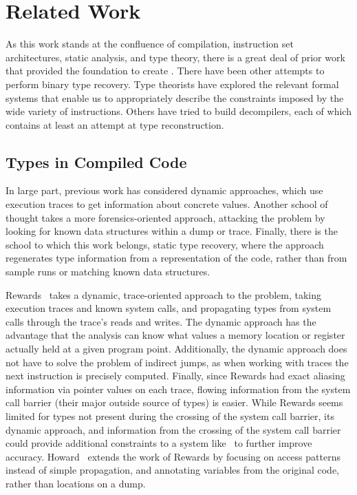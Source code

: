 \section{Related Work}
\label{sec:related}
As this work stands at the confluence of compilation, instruction set architectures, static analysis, and type theory, there is a great deal of prior work that provided the foundation to create \bitr. There have been other attempts to perform binary type recovery. Type theorists have explored the relevant formal systems that enable us to appropriately describe the constraints imposed by the wide variety of instructions. Others have tried to build decompilers, each of which contains at least an attempt at type reconstruction.
\subsection{Types in Compiled Code}
In large part, previous work has considered dynamic approaches, which use execution traces to get information about concrete values. Another school of thought takes a more forensics-oriented approach, attacking the problem by looking for known data structures within a dump or trace. Finally, there is the school to which this work belongs, static type recovery, where the approach regenerates type information from a representation of the code, rather than from sample runs or matching known data structures.

Rewards~\cite{rewards} takes a dynamic, trace-oriented approach to the problem, taking execution traces and known system calls, and propagating types from system calls through the trace's reads and writes. The dynamic approach has the advantage that the analysis can know what values a memory location or register actually held at a given program point. Additionally, the dynamic approach does not have to solve the problem of indirect jumps, as when working with traces the next instruction is precisely computed. Finally, since Rewards had exact aliasing information via pointer values on each trace, flowing information from the system call barrier (their major outside source of types) is easier. While Rewards seems limited for types not present during the crossing of the system call barrier, its dynamic approach, and information from the crossing of the system call barrier could provide additional constraints to a system like \bitr\ to further improve accuracy. Howard~\cite{Slowinska2011} extends the work of Rewards by focusing on access patterns instead of simple propagation, and annotating variables from the original code, rather than locations on a dump.

